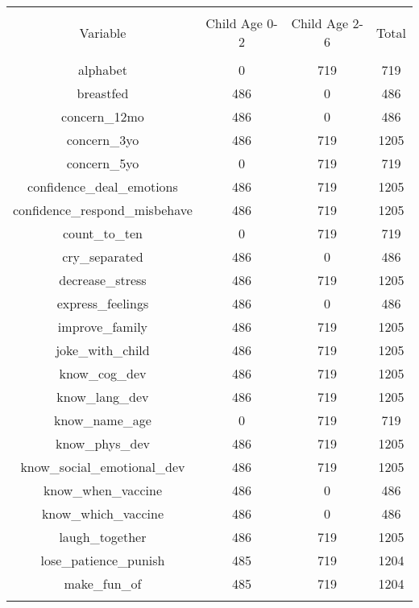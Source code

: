 \begin{table}[t] \centering 
  \caption{} 
  \label{tbl:respondents_childage} 
\begin{adjustbox}{width=0.9\textwidth}
\begin{tabular}{@{\extracolsep{5pt}} cccc} 
\\[-1.8ex]\hline 
\hline \\[-1.8ex] 
Variable & Child Age 0-2 & Child Age 2-6 & Total \\ 
\hline \\[-1.8ex] 
alphabet &   0 & 719 &  719 \\ 
breastfed & 486 &   0 &  486 \\ 
concern\_12mo & 486 &   0 &  486 \\ 
concern\_3yo & 486 & 719 & 1205 \\ 
concern\_5yo &   0 & 719 &  719 \\ 
confidence\_deal\_emotions & 486 & 719 & 1205 \\ 
confidence\_respond\_misbehave & 486 & 719 & 1205 \\ 
count\_to\_ten &   0 & 719 &  719 \\ 
cry\_separated & 486 &   0 &  486 \\ 
decrease\_stress & 486 & 719 & 1205 \\ 
express\_feelings & 486 &   0 &  486 \\ 
improve\_family & 486 & 719 & 1205 \\ 
joke\_with\_child & 486 & 719 & 1205 \\ 
know\_cog\_dev & 486 & 719 & 1205 \\ 
know\_lang\_dev & 486 & 719 & 1205 \\ 
know\_name\_age &   0 & 719 &  719 \\ 
know\_phys\_dev & 486 & 719 & 1205 \\ 
know\_social\_emotional\_dev & 486 & 719 & 1205 \\ 
know\_when\_vaccine & 486 &   0 &  486 \\ 
know\_which\_vaccine & 486 &   0 &  486 \\ 
laugh\_together & 486 & 719 & 1205 \\ 
lose\_patience\_punish & 485 & 719 & 1204 \\ 
make\_fun\_of & 485 & 719 & 1204 \\ 
\hline \\[-1.8ex] 
\end{tabular}
\begin{tabular}[]{@{\extracolsep{5pt}} cccc} 

\end{tabular}
\end{adjustbox}
\end{table}
